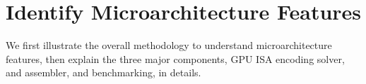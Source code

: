 \section{Identify Microarchitecture Features}
\label{sec:assembler}

We first illustrate the overall methodology to understand microarchitecture features, then explain the three major components, GPU ISA encoding solver, and assembler, and benchmarking, in details.




